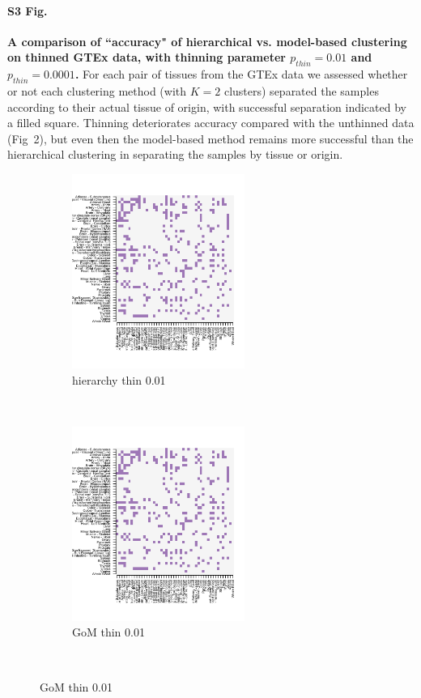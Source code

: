 \documentclass[10pt,letterpaper]{article}
\begin{document}
\paragraph*{S3 Fig.}
\label{figS3}
{\bf A comparison of ``accuracy" of hierarchical vs. model-based clustering on thinned GTEx data, with thinning parameter $p_{thin}=0.01$ and $p_{thin}=0.0001$.}  For each pair of tissues from the GTEx data we assessed whether or not each clustering method (with $K=2$ clusters) separated the samples according to their actual tissue of origin, with successful separation indicated by a filled square. Thinning deteriorates accuracy compared with the unthinned data (Fig~2), but even then the model-based method remains more successful than the hierarchical clustering in separating the samples by tissue or origin.
 \begin{figure}[ht]
    \centering
     \begin{subfigure}[t]{0.5\textwidth}
        \centering
        \includegraphics[height=2.5in]{../../plots/rsz_1hierarchy_F_thin_0_01.png}
        \caption{hierarchy thin 0.01}
    \end{subfigure}%
    ~
    \begin{subfigure}[t]{0.5\textwidth}
        \centering
        \includegraphics[height=2.5in]{../../plots/rsz_1hierarchy_F_thin_0_01.png}
        \caption{GoM thin 0.01}
    \end{subfigure}\\


\end{figure}
\end{document}
